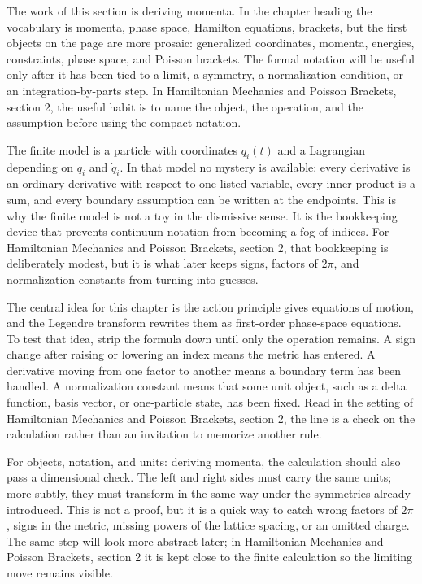 The work of this section is deriving momenta.  In the chapter heading the vocabulary is momenta, phase space, Hamilton equations, brackets, but the first objects on the page are more prosaic: generalized coordinates, momenta, energies, constraints, phase space, and Poisson brackets.  The formal notation will be useful only after it has been tied to a limit, a symmetry, a normalization condition, or an integration-by-parts step.  In Hamiltonian Mechanics and Poisson Brackets, section 2, the useful habit is to name the object, the operation, and the assumption before using the compact notation.

The finite model is a particle with coordinates \(q_i(t)\) and a Lagrangian depending on \(q_i\) and \(\dot q_i\).  In that model no mystery is available: every derivative is an ordinary derivative with respect to one listed variable, every inner product is a sum, and every boundary assumption can be written at the endpoints.  This is why the finite model is not a toy in the dismissive sense.  It is the bookkeeping device that prevents continuum notation from becoming a fog of indices.  For Hamiltonian Mechanics and Poisson Brackets, section 2, that bookkeeping is deliberately modest, but it is what later keeps signs, factors of \(2\pi\), and normalization constants from turning into guesses.

The central idea for this chapter is the action principle gives equations of motion, and the Legendre transform rewrites them as first-order phase-space equations.  To test that idea, strip the formula down until only the operation remains.  A sign change after raising or lowering an index means the metric has entered.  A derivative moving from one factor to another means a boundary term has been handled.  A normalization constant means that some unit object, such as a delta function, basis vector, or one-particle state, has been fixed.  Read in the setting of Hamiltonian Mechanics and Poisson Brackets, section 2, the line is a check on the calculation rather than an invitation to memorize another rule.

For objects, notation, and units: deriving momenta, the calculation should also pass a dimensional check.  The left and right sides must carry the same units; more subtly, they must transform in the same way under the symmetries already introduced.  This is not a proof, but it is a quick way to catch wrong factors of \(2\pi\), signs in the metric, missing powers of the lattice spacing, or an omitted charge.  The same step will look more abstract later; in Hamiltonian Mechanics and Poisson Brackets, section 2 it is kept close to the finite calculation so the limiting move remains visible.

